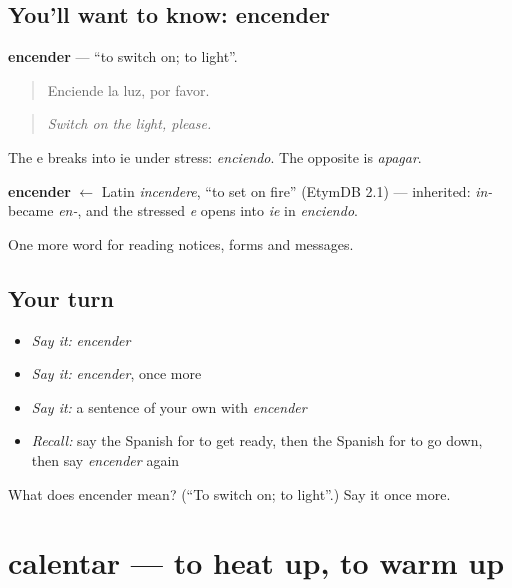 \subsection*{You'll want to know: encender}
\textbf{encender} — \textquotedblleft{}to switch on; to light\textquotedblright{}.

\begin{quote}
Enciende la luz, por favor.
\end{quote}

\begin{quote}
\emph{Switch on the light, please.}
\end{quote}

The e breaks into ie under stress: \emph{enciendo}. The opposite is \emph{apagar}.

\begin{cousinweb}
\textbf{encender} $\leftarrow$ Latin \emph{incendere}, \textquotedblleft{}to set on fire\textquotedblright{} (EtymDB 2.1) — inherited: \emph{in-} became \emph{en-}, and the stressed \emph{e} opens into \emph{ie} in \emph{enciendo}.
\end{cousinweb}

\begin{grammarlens}[title={What you've built}]
One more word for reading notices, forms and messages.
\end{grammarlens}

\subsection*{Your turn}
\begin{itemize}
\raggedright
  \item \emph{Say it:} \emph{encender}
  \item \emph{Say it:} \emph{encender}, once more
  \item \emph{Say it:} a sentence of your own with \emph{encender}
  \item \emph{Recall:} say the Spanish for to get ready, then the Spanish for to go down, then say \emph{encender} again
\end{itemize}

\begin{tcolorbox}[breakable,colback=teal!4,colframe=teal!35!black,title={Before you move on}]
What does encender mean? (\textquotedblleft{}To switch on; to light\textquotedblright{}.) Say it once more.
\end{tcolorbox}
\section[calentar]{calentar — to heat up, to warm up}

